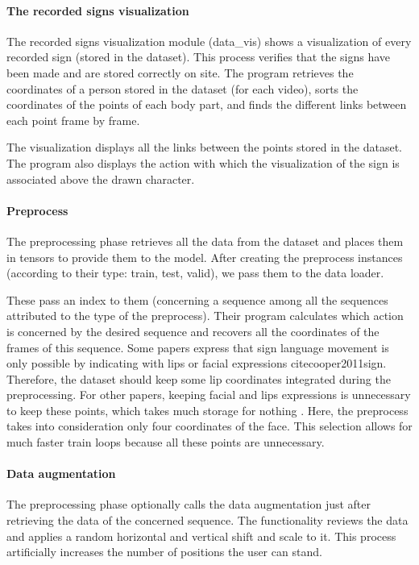 \paragraph{The recorded signs visualization}

The recorded signs visualization module (data\_vis) shows a visualization of every recorded sign (stored in the dataset). This process verifies that the signs have been made and are stored correctly on site.
The program retrieves the coordinates of a person stored in the dataset (for each video), sorts the coordinates of the points of each body part, and finds the different links between each point frame by frame. 

The visualization displays all the links between the points stored in the dataset. The program also displays the action with which the visualization of the sign is associated above the drawn character.

\paragraph{Preprocess}

The preprocessing phase retrieves all the data from the dataset and places them in tensors to provide them to the model.
After creating the preprocess instances (according to their type: train, test, valid), we pass them to the data loader. 

These pass an index to them (concerning a sequence among all the sequences attributed to the type of the preprocess). Their program calculates which action is concerned by the desired sequence and recovers all the coordinates of the frames of this sequence. 
Some papers express that sign language movement is only possible by indicating with lips or facial expressions cite{cooper2011sign}. Therefore, the dataset should keep some lip coordinates integrated during the preprocessing. For other papers, keeping facial and lips expressions is unnecessary to keep these points, which takes much storage for nothing \cite{dreuw2007speech}. Here, the preprocess takes into consideration only four coordinates of the face. This selection allows for much faster train loops because all these points are unnecessary.

\paragraph{Data augmentation}

The preprocessing phase optionally calls the data augmentation just after retrieving the data of the concerned sequence. The functionality reviews the data and applies a random horizontal and vertical shift and scale to it. This process artificially increases the number of positions the user can stand.

